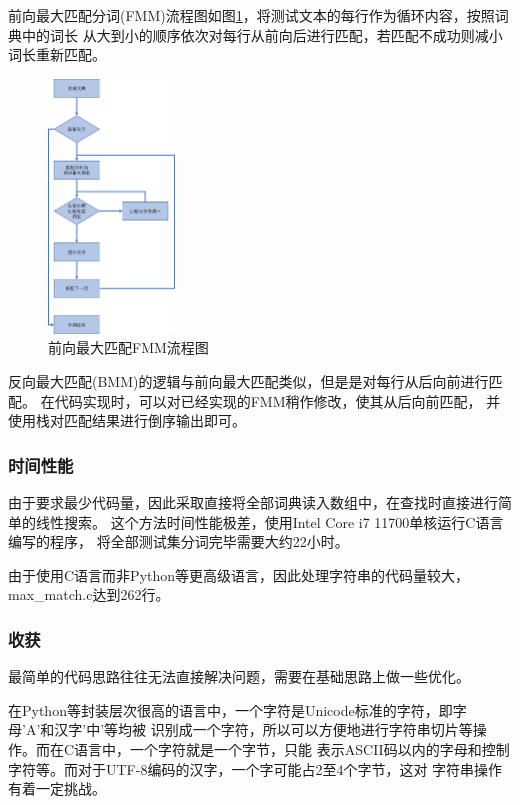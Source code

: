 前向最大匹配分词(FMM)流程图如图\ref{fmm}，将测试文本的每行作为循环内容，按照词典中的词长
从大到小的顺序依次对每行从前向后进行匹配，若匹配不成功则减小词长重新匹配。

\begin{figure}[H]
  \centering
  \includegraphics[width=0.3\textwidth]{figures/figure_01.png}
  \caption{前向最大匹配FMM流程图}
  \label{fmm}
\end{figure}

反向最大匹配(BMM)的逻辑与前向最大匹配类似，但是是对每行从后向前进行匹配。
在代码实现时，可以对已经实现的FMM稍作修改，使其从后向前匹配，
并使用栈对匹配结果进行倒序输出即可。

\subsubsection{时间性能}

由于要求最少代码量，因此采取直接将全部词典读入数组中，在查找时直接进行简单的线性搜索。
这个方法时间性能极差，使用Intel Core i7 11700单核运行C语言编写的程序，
将全部测试集分词完毕需要大约22小时。

由于使用C语言而非Python等更高级语言，因此处理字符串的代码量较大，max\_match.c达到262行。

\subsubsection{收获}

最简单的代码思路往往无法直接解决问题，需要在基础思路上做一些优化。

在Python等封装层次很高的语言中，一个字符是Unicode标准的字符，即字母'A'和汉字'中'等均被
识别成一个字符，所以可以方便地进行字符串切片等操作。而在C语言中，一个字符就是一个字节，只能
表示ASCII码以内的字母和控制字符等。而对于UTF-8编码的汉字，一个字可能占2至4个字节，这对
字符串操作有着一定挑战。

